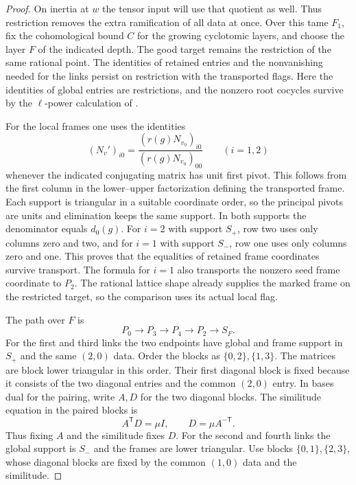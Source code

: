 \begin{proof}
On inertia at
\(w\) the tensor input will use that quotient as
well. Thus restriction removes the extra ramification
of all data at once. Over this tame \(F_1\), fix the
cohomological bound \(C\) for the growing cyclotomic
layers, and choose the layer \(F\) of the indicated
depth. The good target remains the restriction of
the same rational point. The identities of retained
entries and the nonvanishing needed for the links
persist on restriction with the transported flags.
Here the identities of global entries are
restrictions, and the nonzero root cocycles survive
by the \(\ell\)-power calculation of
\cite{count-two-cohomology}.

For the local frames one uses the identities
\[
 (N_v')_{i0} =
 \frac{(r(g)N_{v_0})_{i0}}{(r(g)N_{v_0})_{00}}
 \qquad (i=1,2)
\]
whenever the indicated conjugating matrix has unit
first pivot. This follows from the first column in
the lower--upper factorization defining the
transported frame. Each support is triangular in
a suitable coordinate order, so the principal pivots
are units and elimination keeps the same support. In both supports the denominator
equals \(d_0(g)\). For \(i=2\) with support \(S_+\),
row two uses only columns zero and two, and for
\(i=1\) with support \(S_-\), row one uses only
columns zero and one. This proves that the equalities
of retained frame coordinates survive transport.
The formula for \(i=1\) also transports the
nonzero seed frame coordinate to \(P_2\).
The rational lattice shape already supplies the
marked frame on the restricted target, so the
comparison uses its actual local flag.

The path over \(F\) is
\[
                     P_0\longrightarrow P_3
                  \longrightarrow P_4
                  \longrightarrow P_2
                  \longrightarrow S_F .
\]
For the first and third links the two endpoints
have global and frame support in \(S_+\) and
the same \((2,0)\) data. Order the blocks as
\(\{0,2\},\{1,3\}\). The matrices are block lower
triangular in this order. Their first diagonal
block is fixed because it consists of the two
diagonal entries and the common \((2,0)\)
entry. In bases dual for the pairing, write \(A,D\) for the two diagonal blocks. The similitude equation in the paired blocks is
\[
 A^{\mathsf T}D=\mu I,\qquad D=\mu A^{-\mathsf T}.
\]
Thus fixing \(A\) and the similitude fixes \(D\). For the second
and fourth links the global support is \(S_-\)
and the frames are lower triangular.
Use blocks \(\{0,1\},\{2,3\}\), whose diagonal
blocks are fixed by the common \((1,0)\) data and
the similitude.


\end{proof}
